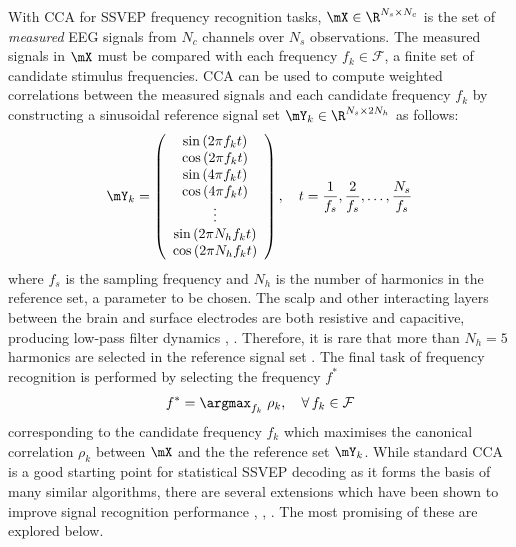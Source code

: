 With CCA for SSVEP frequency recognition tasks, $\mX \in \R^{N_s\times N_c}$ is the set of \textit{measured} EEG signals from $N_c$ channels over $N_s$ observations. The measured signals in $\mX$ must be compared with each frequency $f_k \in \mathcal{F}$, a finite set of candidate stimulus frequencies. CCA can be used to compute weighted correlations between the measured signals and each candidate frequency $f_k$ by constructing a sinusoidal reference signal set $\mY_k \in \R^{N_s \times 2N_h}$ as follows: 
\begin{equation}
\mY_{k}=\left(\begin{array}{c}
\sin \left(2 \pi f_{k} t\right) \\
\cos \left(2 \pi f_{k} t\right) \\
\sin \left(4 \pi f_{k} t\right) \\
\cos \left(4 \pi f_{k} t\right) \\
\vdots \\
\sin \left(2 \pi N_h f_{k} t\right) \\
\cos \left(2 \pi N_h f_{k} t\right)
\end{array}\right), \quad t=\frac{1}{f_s}, \frac{2}{f_s}, \ldots, \frac{N_s}{f_s}
\label{eq:sinusoidal-ref}
\end{equation}
where $f_s$ is the sampling frequency and $N_h$ is the number of harmonics in the reference set, a parameter to be chosen. The scalp and other interacting layers between the brain and surface electrodes are both resistive and capacitive, producing low-pass filter dynamics \cite{baillet-em-brain-mapping}, \cite{lin-cca-2006}. Therefore, it is rare that more than $N_h=5$ harmonics are selected in the reference signal set \cite{lin-cca-2006}. The final task of frequency recognition is performed by selecting the frequency $f^*$
\begin{equation}
    f^* = \argmax_{f_k} \; \rho_k, \quad \forall \, f_k \in \mathcal{F}
    \label{eq:cca-freq-discrimination}
\end{equation}
corresponding to the candidate frequency $f_k$ which maximises the canonical correlation $\rho_k$ between $\mX$ and the the reference set $\mY_k$. While standard CCA is a good starting point for statistical SSVEP decoding as it forms the basis of many similar algorithms, there are several extensions which have been shown to improve signal recognition performance \cite{zhang-mset-cca}, \cite{sun-gcca}, \cite{miao-hybrid-cca}. The most promising of these are explored below.


